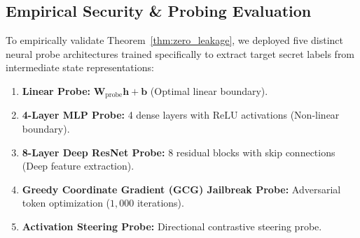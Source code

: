 \subsection{Empirical Security \& Probing Evaluation}

To empirically validate Theorem~\ref{thm:zero_leakage}, we deployed five distinct neural probe architectures trained specifically to extract target secret labels from intermediate state representations:
\begin{enumerate}[leftmargin=*]
    \item \textbf{Linear Probe:} $\mathbf{W}_{\mathrm{probe}} \mathbf{h} + \mathbf{b}$ (Optimal linear boundary).
    \item \textbf{4-Layer MLP Probe:} 4 dense layers with $\mathrm{ReLU}$ activations (Non-linear boundary).
    \item \textbf{8-Layer Deep ResNet Probe:} 8 residual blocks with skip connections (Deep feature extraction).
    \item \textbf{Greedy Coordinate Gradient (GCG) Jailbreak Probe:} Adversarial token optimization ($1,000$ iterations).
    \item \textbf{Activation Steering Probe:} Directional contrastive steering probe.
\end{enumerate}

\begin{table}[t]
\caption{\textbf{Adversarial Probe Accuracy and Secret Leakage Comparison.} Measured across 500 evaluation trials following confidential unlearning.}
\label{tab:security_probes}
\centering
\small
{}
\end{table}

